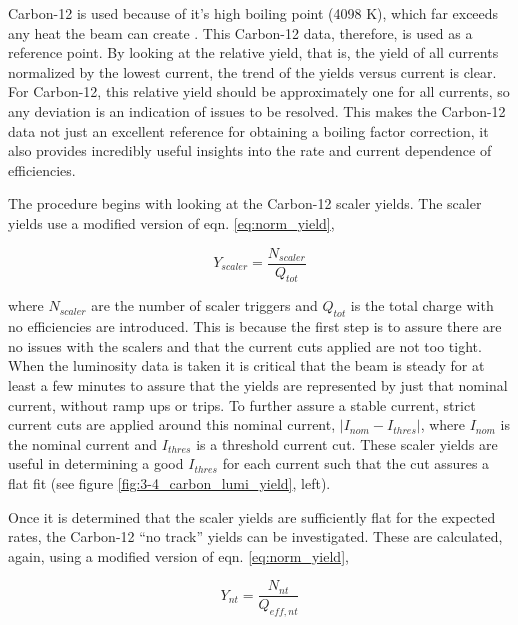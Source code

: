 \documentclass[
]{report}
\begin{document}
Carbon-12 is used because of it's high boiling point (4098 K), which far
exceeds any heat the beam can create
\cite{thomas_jefferson_national_accelerator_facility_-_office_of_science_education_its_2023}.
This Carbon-12 data, therefore, is used as a reference point. By looking
at the relative yield, that is, the yield of all currents normalized by
the lowest current, the trend of the yields versus current is clear. For
Carbon-12, this relative yield should be approximately one for all
currents, so any deviation is an indication of issues to be resolved.
This makes the Carbon-12 data not just an excellent reference for
obtaining a boiling factor correction, it also provides incredibly
useful insights into the rate and current dependence of efficiencies.

The procedure begins with looking at the Carbon-12 scaler yields. The
scaler yields use a modified version of eqn. \ref{eq:norm_yield},

\begin{equation} 
  Y_{scaler}=\frac{N_{scaler}}{Q_{tot}}
  \label{eq:scaler_yield} 
\end{equation}

\noindent where \(N_{scaler}\) are the number of scaler triggers and
\(Q_{tot}\) is the total charge with no efficiencies are introduced.
This is because the first step is to assure there are no issues with the
scalers and that the current cuts applied are not too tight. When the
luminosity data is taken it is critical that the beam is steady for at
least a few minutes to assure that the yields are represented by just
that nominal current, without ramp ups or trips. To further assure a
stable current, strict current cuts are applied around this nominal
current, \(\left|I_{nom}-I_{thres}\right|\), where \(I_{nom}\) is the
nominal current and \(I_{thres}\) is a threshold current cut. These
scaler yields are useful in determining a good \(I_{thres}\) for each
current such that the cut assures a flat fit (see figure
\ref{fig:3-4_carbon_lumi_yield}, left).



Once it is determined that the scaler yields are sufficiently flat for
the expected rates, the Carbon-12 ``no track'' yields can be
investigated. These are calculated, again, using a modified version of
eqn. \ref{eq:norm_yield},

\begin{equation} 
  Y_{nt}=\frac{N_{nt}}{Q_{eff,nt}}
  \label{eq:nt_yield} 
\end{equation}
\end{document}
